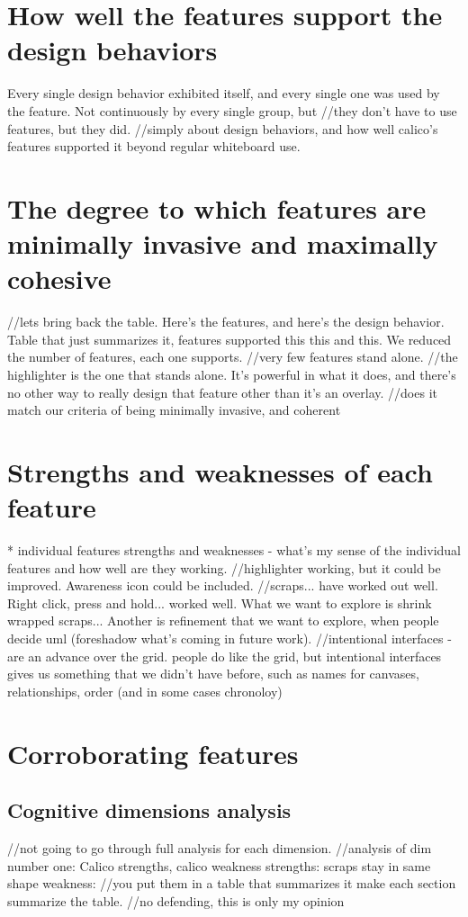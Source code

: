 \section{How well the features support the design behaviors}

Every single design behavior exhibited itself, and every single one was used by the feature. Not continuously by every single group, but
//they don't have to use features, but they did. 
//simply about design behaviors, and how well calico's features supported it beyond regular whiteboard use.

\section{The degree to which features are minimally invasive and maximally cohesive}

//lets bring back the table. Here's the features, and here's the design behavior. Table that just summarizes it, features supported this this and this. We reduced the number of features, each one supports.
//very few features stand alone.
//the highlighter is the one that stands alone. It's powerful in what it does, and there's no other way to really design that feature other than it's an overlay.
//does it match our criteria of being minimally invasive, and coherent 


\section{Strengths and weaknesses of each feature}
* individual features strengths and weaknesses - what's my sense of the individual features and how well are they working.
//highlighter working, but it could be improved. Awareness icon could be included.
//scraps... have worked out well. Right click, press and hold... worked well. What we want to explore is shrink wrapped scraps... Another is refinement that we want to explore, when people decide uml (foreshadow what's coming in future work).
//intentional interfaces - are an advance over the grid. people do like the grid, but intentional interfaces gives us something that we didn't have before, such as names for canvases, relationships, order (and in some cases chronoloy)


\section{Corroborating features}

\subsection{Cognitive dimensions analysis}
//not going to go through full analysis for each dimension.
//analysis of dim number one: Calico strengths, calico weakness
strengths: scraps stay in same shape
weakness: 
//you put them in a table that summarizes it
make each section summarize the table.
//no defending, this is only my opinion

